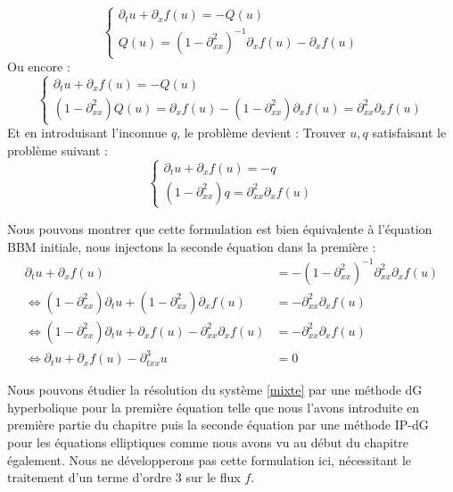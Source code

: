 $$\begin{cases}
    \partial_t u + \partial_x f(u) = - Q(u) \\
    Q(u) = (1 - \partial_{xx}^2)^{-1} \partial_x f(u) - \partial_x f(u)
\end{cases}$$
Ou encore :
$$\begin{cases}
    \partial_t u + \partial_x f(u) = - Q(u) \\
    (1 - \partial_{xx}^2)Q(u) = \partial_xf(u) - (1 - \partial_{xx}^2) \partial_x f(u) = \partial_{xx}^2\partial_x f(u)
\end{cases}$$
Et en introduisant l'inconnue $q$, le problème devient : Trouver $u,q$ satisfaisant le problème suivant :
\begin{equation}
    \begin{cases}
    \partial_t u + \partial_x f(u) = - q \\
    (1 - \partial_{xx}^2)q = \partial_{xx}^2\partial_x f(u)
\end{cases} \label{mixte}
\end{equation}

Nous pouvons montrer que cette formulation est bien équivalente à l'équation BBM initiale, nous injectons la seconde équation dans la première :
\begin{equation*}
\begin{split}
    \partial_t u + \partial_x f(u) &= - (1 - \partial_{xx}^2)^{-1}\partial_{xx}^2\partial_x f(u) \\
    \Leftrightarrow (1 - \partial_{xx}^2)\partial_t u + (1 - \partial_{xx}^2)\partial_x f(u) &= - \partial_{xx}^2\partial_x f(u) \\
    \Leftrightarrow (1 - \partial_{xx}^2)\partial_t u + \partial_x f(u) - \partial_{xx}^2\partial_xf(u) &= - \partial_{xx}^2\partial_x f(u) \\
    \Leftrightarrow \partial_t u + \partial_x f(u) - \partial_{txx}^3 u &= 0
\end{split}
\end{equation*}

Nous pouvons étudier la résolution du système \ref{mixte} par une méthode dG hyperbolique pour la première équation telle que nous l'avons introduite en première partie du chapitre
puis la seconde équation par une méthode IP-dG pour les équations elliptiques comme nous avons vu au début du chapitre également.
Nous ne développerons pas cette formulation ici, nécessitant le traitement d'un terme d'ordre 3 sur le flux $f$.